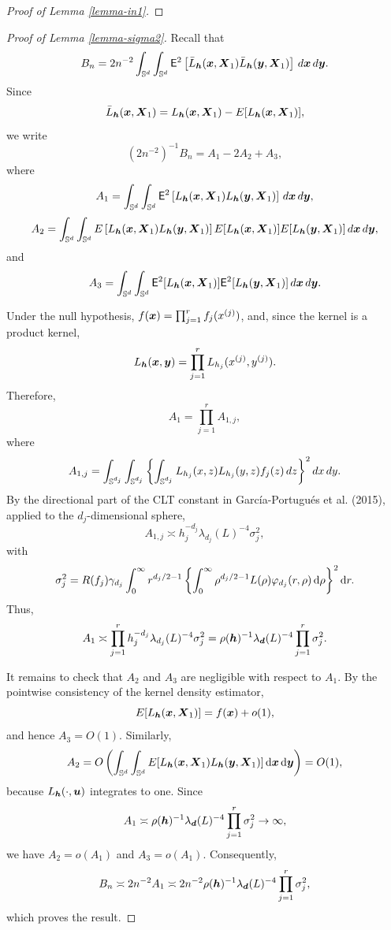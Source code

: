 \documentclass[oneside,11pt]{article}
\begin{document}
\begin{proof}[Proof of Lemma \ref{lemma-in1}]

\end{proof}

\begin{proof}[ Proof of Lemma \ref{lemma-sigma2}]

Recall that
\[
B_n
=
2n^{-2}\int_{\mathbb{S}^{d}}\int_{\mathbb{S}^{d}}
\mathsf{E}^2\left[
\bar{L}_{{\boldsymbol{h}}}(\boldsymbol{x},\boldsymbol{X}_1)
\bar{L}_{{\boldsymbol{h}}}(\boldsymbol{y},\boldsymbol{X}_1)
\right]
\,d\boldsymbol{x}\,d\boldsymbol{y} .
\]
Since
\[
\bar{L}_{{\boldsymbol{h}}}(\boldsymbol{x},\boldsymbol{X}_1)
=
L_{{\boldsymbol{h}}}(\boldsymbol{x},\boldsymbol{X}_1)
-
E[L_{{\boldsymbol{h}}}(\boldsymbol{x},\boldsymbol{X}_1)],
\]
we write
\[
(2n^{-2})^{-1}B_n=A_1-2A_2+A_3,
\]
where
\[
A_1
=
\int_{\mathbb{S}^{d}}\int_{\mathbb{S}^{d}}
\mathsf{E}^2\left[
L_{{\boldsymbol{h}}}(\boldsymbol{x},\boldsymbol{X}_1)L_{{\boldsymbol{h}}}(\boldsymbol{y},\boldsymbol{X}_1)
\right]
\,d\boldsymbol{x}\,d\boldsymbol{y},
\]
\[
A_2
=
\int_{\mathbb{S}^{d}}\int_{\mathbb{S}^{d}}
E\left[
L_{{\boldsymbol{h}}}(\boldsymbol{x},\boldsymbol{X}_1)L_{{\boldsymbol{h}}}(\boldsymbol{y},\boldsymbol{X}_1)
\right]
E[L_{{\boldsymbol{h}}}(\boldsymbol{x},\boldsymbol{X}_1)]
E[L_{{\boldsymbol{h}}}(\boldsymbol{y},\boldsymbol{X}_1)]
\,d\boldsymbol{x}\,d\boldsymbol{y},
\]
and
\[
A_3
=
\int_{\mathbb{S}^{d}}\int_{\mathbb{S}^{d}}
\mathsf{E}^2[L_{{\boldsymbol{h}}}(\boldsymbol{x},\boldsymbol{X}_1)]
\mathsf{E}^2[L_{{\boldsymbol{h}}}(\boldsymbol{y},\boldsymbol{X}_1)]
\,d\boldsymbol{x}\,d\boldsymbol{y}.
\]

Under the null hypothesis, \(f(\boldsymbol{x})=\prod_{j=1}^r f_j(x^{(j)})\), and, since the kernel is a product kernel,
\[
L_{{\boldsymbol{h}}}(\boldsymbol{x},\boldsymbol{y})
=
\prod_{j=1}^r L_{h_j}(x^{(j)},y^{(j)}).
\]
Therefore,
\[
A_1=\prod_{j=1}^r A_{1,j},
\]
where
\[
A_{1,j}
=
\int_{\mathbb{S}^{d_j}}\int_{\mathbb{S}^{d_j}}
\left\{
\int_{\mathbb{S}^{d_j}}
L_{h_j}(x,z)L_{h_j}(y,z)f_j(z)\,dz
\right\}^2
dx\,dy.
\]
By the directional part of the CLT constant in García-Portugués et al. (2015), applied to the
\(d_j\)-dimensional sphere,
\[
A_{1,j}
\asymp
h_j^{-d_j}\lambda_{d_j}(L)^{-4}\sigma_j^2,
\]
with
\[
\sigma_j^2
=
R(f_j)\gamma_{d_j}
\int_0^\infty
r^{d_j/2-1}
\left\{
\int_0^\infty
\rho^{d_j/2-1}L(\rho)\varphi_{d_j}(r,\rho)
\,\mathrm{d}\rho
\right\}^2
\mathrm{d} r.
\]
Thus,
\[
A_1
\asymp
\prod_{j=1}^r
h_j^{-d_j}\lambda_{d_j}(L)^{-4}\sigma_j^2
=
\rho({\boldsymbol{h}})^{-1}\lambda_{\boldsymbol{d}}(L)^{-4}
\prod_{j=1}^r\sigma_j^2.
\]

It remains to check that \(A_2\) and \(A_3\) are negligible with respect to \(A_1\). By the pointwise
consistency of the kernel density estimator,
\[
E[L_{{\boldsymbol{h}}}(\boldsymbol{x},\boldsymbol{X}_1)]=f(\boldsymbol{x})+o(1),
\]
and hence \(A_3=O(1)\). Similarly,
\[
A_2
=
O\left(
\int_{\mathbb{S}^{d}}\int_{\mathbb{S}^{d}}
E[
L_{{\boldsymbol{h}}}(\boldsymbol{x},\boldsymbol{X}_1)L_{{\boldsymbol{h}}}(\boldsymbol{y},\boldsymbol{X}_1)
]
\,\mathrm{d}\boldsymbol{x}\,\mathrm{d}\boldsymbol{y}
\right)
=
O(1),
\]
because \(L_{{\boldsymbol{h}}}(\cdot,\boldsymbol{u})\) integrates to one. Since
\[
A_1\asymp \rho({\boldsymbol{h}})^{-1}\lambda_{\boldsymbol{d}}(L)^{-4}
\prod_{j=1}^r\sigma_j^2
\to \infty,
\]
we have \(A_2=o(A_1)\) and \(A_3=o(A_1)\). Consequently,
\[
B_n
\asymp
2n^{-2}A_1
\asymp
2n^{-2}\rho({\boldsymbol{h}})^{-1}\lambda_{\boldsymbol{d}}(L)^{-4}
\prod_{j=1}^r\sigma_j^2,
\]
which proves the result.

\end{proof}
\end{document}
